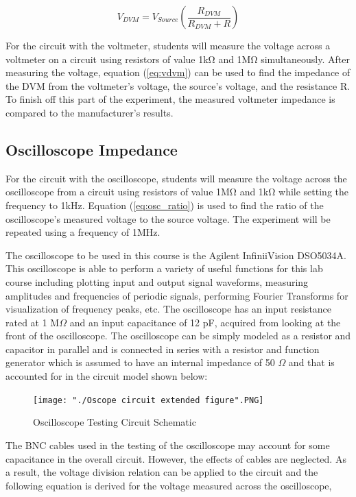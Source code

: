 \documentclass[a4paper,titlepage,10pt]{article}
\begin{document}
\begin{equation}
	\label{eq:vdvm}
	V_{DVM} = V_{Source}(\frac{R_{DVM}}{R_{DVM} + R}) 
\end{equation}

For the circuit with the voltmeter, students will measure the voltage across a voltmeter on a circuit using resistors of value 1k\si{\ohm} and 1M\si{\ohm} simultaneously. After measuring the voltage, equation (\ref{eq:vdvm}) can be used to find the impedance of the DVM from the voltmeter's voltage, the source's voltage, and the resistance R. To finish off this part of the experiment, the measured voltmeter impedance is compared to the manufacturer's results. 
\subsection{Oscilloscope Impedance}
%
For the circuit with the oscilloscope, students will measure the voltage across the oscilloscope from a circuit using resistors of value 1M\si{\ohm} and 1k\si{\ohm} while setting the frequency to 1kHz. Equation (\ref{eq:osc_ratio}) is used to find the ratio of the oscilloscope's measured voltage to the source voltage. The experiment will be repeated using a frequency of 1MHz.

The oscilloscope to be used in this course is the Agilent InfiniiVision DSO5034A. This oscilloscope is able to perform a variety of useful functions for this lab course including plotting input and output signal waveforms, measuring amplitudes and frequencies of periodic signals, performing Fourier Transforms for visualization of frequency peaks, etc. The oscilloscope has an input resistance rated at 1 M$\Omega$ and an input capacitance of 12 pF, acquired from looking at the front of the oscilloscope. The oscilloscope can be simply modeled as a resistor and capacitor in parallel and is connected in series with a resistor and function generator which is assumed to have an internal impedance of 50 $\Omega$ and that is accounted for in the circuit model shown below: 

\begin{figure}[h!]
	\centering
	\texttt{[image: "./Oscope circuit extended figure".PNG]}
	\caption{Oscilloscope Testing Circuit Schematic}
	\label{fig:scope_circuit}
\end{figure}

The BNC cables used in the testing of the oscilloscope may account for some capacitance in the overall circuit. However, the effects of cables are neglected. As a result, the voltage division relation can be applied to the circuit and the following equation is derived for the voltage measured across the oscilloscope,
\end{document}
